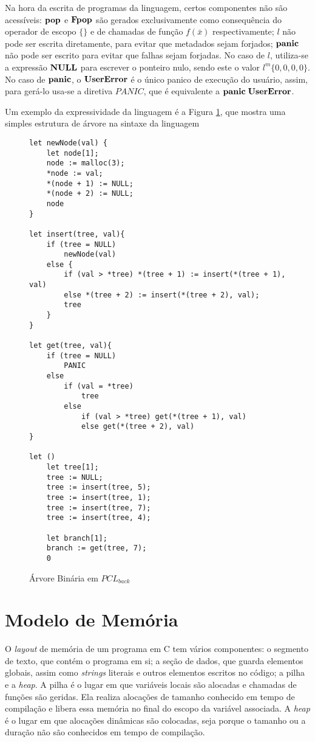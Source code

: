Na hora da escrita de programas da linguagem, certos componentes não são acessíveis: $\mathbf{pop}$ e $\mathbf{Fpop}$ são gerados exclusivamente como consequência do operador de escopo $\{\}$ e de chamadas de função $f(\bar x)$ respectivamente; $l$ não pode ser escrita diretamente, para evitar que metadados sejam forjados; $\mathbf{panic}$ não pode ser escrito para evitar que falhas sejam forjadas. No caso de $l$, utiliza-se a expressão $\mathbf{NULL}$ para escrever o ponteiro nulo, sendo este o valor $l^m\{0, 0, 0, 0\}$. No caso de $\mathbf{panic}$, o $\mathbf{UserError}$ é o único panico de execução do usuário, assim, para gerá-lo usa-se a diretiva $PANIC$, que é equivalente a $\mathbf{panic}\;\mathbf{UserError}$.

Um exemplo da expressividade da linguagem é a Figura \ref{lst:pclback:tree}, que mostra uma simples estrutura de árvore na sintaxe da linguagem

\begin{figure}[ht]
	\caption{Árvore Binária em $PCL_{back}$}
	\label{lst:pclback:tree}
	\begin{lstlisting}[language=PCLback]
let newNode(val) {
	let node[1];
	node := malloc(3);
	*node := val;
	*(node + 1) := NULL;
	*(node + 2) := NULL;
	node
}

let insert(tree, val){
	if (tree = NULL) 
		newNode(val)
	else {
		if (val > *tree) *(tree + 1) := insert(*(tree + 1), val)
		else *(tree + 2) := insert(*(tree + 2), val);
		tree
	}
}

let get(tree, val){
	if (tree = NULL) 
		PANIC
	else
		if (val = *tree)
			tree
		else
			if (val > *tree) get(*(tree + 1), val)
			else get(*(tree + 2), val)
}

let () 
	let tree[1];
	tree := NULL;
	tree := insert(tree, 5);
	tree := insert(tree, 1);
	tree := insert(tree, 7);
	tree := insert(tree, 4);

	let branch[1];
	branch := get(tree, 7);
	0
	\end{lstlisting}
\end{figure}
\FloatBarrier

\section{Modelo de Memória}
\label{sec:memory-model}

O \emph{layout} de memória de um programa em C tem vários componentes: o segmento de texto, que contém o programa em si; a seção de dados, que guarda elementos globais, assim como \emph{strings} literais e outros elementos escritos no código; a pilha e a \emph{heap}. A pilha é o lugar em que variáveis locais são alocadas e chamadas de funções são geridas. Ela realiza alocações de tamanho conhecido em tempo de compilação e libera essa memória no final do escopo da variável associada. A \emph{heap} é o lugar em que alocações dinâmicas são colocadas, seja porque o tamanho ou a duração não são conhecidos em tempo de compilação.

